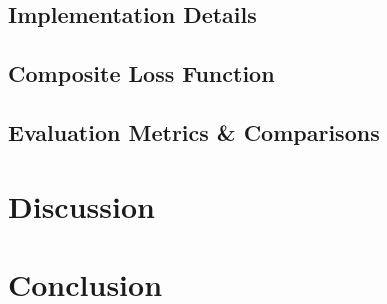 \documentclass[11pt]{article}
\begin{document}
\subsection{Implementation Details}
\subsection{Composite Loss Function}
\subsection{Evaluation Metrics & Comparisons}

\section{Discussion}

\section{Conclusion}

\end{document}
